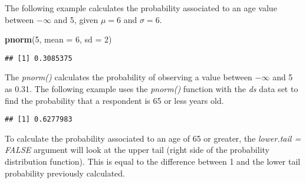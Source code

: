 \documentclass[]{article}
\newenvironment{Shaded}{\begin{snugshade}}{\end{snugshade}}
\newcommand{\KeywordTok}[1]{\textcolor[rgb]{0.13,0.29,0.53}{\textbf{#1}}}
\newcommand{\DataTypeTok}[1]{\textcolor[rgb]{0.13,0.29,0.53}{#1}}
\newcommand{\DecValTok}[1]{\textcolor[rgb]{0.00,0.00,0.81}{#1}}
\newcommand{\OtherTok}[1]{\textcolor[rgb]{0.56,0.35,0.01}{#1}}
\newcommand{\OperatorTok}[1]{\textcolor[rgb]{0.81,0.36,0.00}{\textbf{#1}}}
\newcommand{\NormalTok}[1]{#1}
\begin{document}
The following example calculates the probability associated to an age
value between \(-\infty\) and 5, given \(\mu = 6\) and \(\sigma = 6\).

\begin{Shaded}
\begin{Highlighting}[]
\KeywordTok{pnorm}\NormalTok{(}\DecValTok{5}\NormalTok{, }\DataTypeTok{mean =} \DecValTok{6}\NormalTok{, }\DataTypeTok{sd =} \DecValTok{2}\NormalTok{)}
\end{Highlighting}
\end{Shaded}

\begin{verbatim}
## [1] 0.3085375
\end{verbatim}

The \emph{pnorm()} calculates the probability of observing a value
between \(-\infty\) and 5 as 0.31. The following example uses the
\emph{pnorm()} function with the \emph{ds} data set to find the
probability that a respondent is 65 or less years old.

\begin{Shaded}
\end{Shaded}

\begin{verbatim}
## [1] 0.6277983
\end{verbatim}

To calculate the probability associated to an age of 65 or greater, the
\emph{lower.tail = FALSE} argument will look at the upper tail (right
side of the probability distribution function). This is equal to the
difference between 1 and the lower tail probability previously
calculated.

\begin{Shaded}
\end{Shaded}
\end{document}
